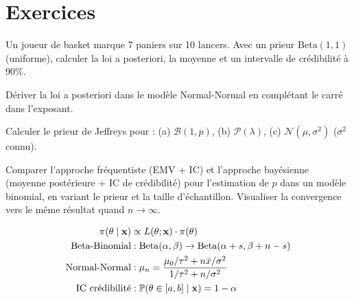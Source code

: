 \section{Exercices}

\begin{exercice}
Un joueur de basket marque 7 paniers sur 10 lancers. Avec un prieur $\mathrm{Beta}(1,1)$ (uniforme), calculer la loi a posteriori, la moyenne et un intervalle de cr\'edibilit\'e \`a 90\%.
\end{exercice}

\begin{exercice}
D\'eriver la loi a posteriori dans le mod\`ele Normal-Normal en compl\'etant le carr\'e dans l'exposant.
\end{exercice}

\begin{exercice}
Calculer le prieur de Jeffreys pour : (a) $\mathcal{B}(1,p)$, (b) $\mathcal{P}(\lambda)$, (c) $\mathcal{N}(\mu,\sigma^2)$ ($\sigma^2$ connu).
\end{exercice}

\begin{exercice}
Comparer l'approche fr\'equentiste (EMV + IC) et l'approche bay\'esienne (moyenne post\'erieure + IC de cr\'edibilit\'e) pour l'estimation de $p$ dans un mod\`ele binomial, en variant le prieur et la taille d'\'echantillon. Visualiser la convergence vers le m\^eme r\'esultat quand $n\to\infty$.
\end{exercice}

\begin{formules}
\begin{align*}
\pi(\theta\mid\mathbf{x}) &\propto L(\theta;\mathbf{x})\cdot\pi(\theta) \\
\text{Beta-Binomial} &: \mathrm{Beta}(\alpha,\beta)\to\mathrm{Beta}(\alpha+s,\beta+n-s) \\
\text{Normal-Normal} &: \mu_n=\frac{\mu_0/\tau^2+n\bar{x}/\sigma^2}{1/\tau^2+n/\sigma^2} \\
\text{IC cr\'edibilit\'e} &: \mathbb{P}(\theta\in[a,b]\mid\mathbf{x})=1-\alpha
\end{align*}
\end{formules}

